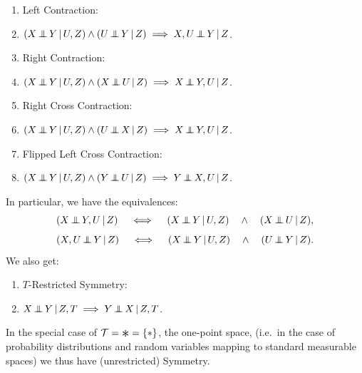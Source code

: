 \begin{DefThm}
\begin{enumerate}[label=\alph*)]
\item Left Contraction:\item[] 
 $ (X \Indep  Y \given U , Z) \land (U \Indep  Y \given Z) \implies X , U \Indep  Y \given Z$.
\item Right Contraction:
\item[] $ (X \Indep  Y \given U , Z) \land (X \Indep  U \given Z)  \implies X \Indep  Y , U \given Z$.
\item Right Cross Contraction:
\item[] $ (X \Indep  Y \given U , Z) \land (U \Indep  X \given Z) \implies X  \Indep  Y , U \given Z$.
\item Flipped Left Cross Contraction: 
\item[] $ (X \Indep  Y \given U , Z) \land (Y \Indep  U \given Z) \implies Y \Indep  X , U \given Z$.
\end{enumerate}
In particular, we have the equivalences:
$$ (X \Indep  Y , U \given Z) \quad\iff\quad (X \Indep  Y \given U , Z) \quad\land\quad (X \Indep  U \given Z)  ,$$
$$ (X , U \Indep  Y \given Z) \quad\iff\quad (X \Indep  Y \given U , Z) \quad\land\quad (U \Indep  Y \given Z).$$
We also get:
\begin{enumerate}[resume,label=\alph*)]
    \item $T$-Restricted Symmetry: %
	\item[] $X \Indep  Y \given Z,T \implies Y \Indep X \given Z,T$. 
\end{enumerate}
In the special case of $\Tcal = \Asterisk = \{\ast\}$, the one-point space, (i.e.\ in the case of probability distributions and random variables mapping to standard measurable spaces) we
thus have (unrestricted) Symmetry.
\end{DefThm}



